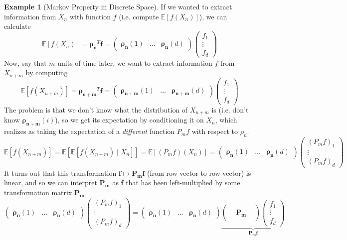 \documentclass{article}
\theoremstyle{definition}
\newtheorem{example}{Example}[section]
\theoremstyle{remark}
\theoremstyle{definition}
\begin{document}
\begin{example}[Markov Property in Discrete Space]
If we wanted to extract information from $X_n$ with function $f$ (i.e. compute $\mathbb{E}[f(X_n)]$), we can calculate 
\[\mathbb{E}[f(X_n)] = \boldsymbol{\rho_n}^T \mathbf{f} =  \begin{pmatrix} \boldsymbol{\rho_n} (1) & \ldots & \boldsymbol{\rho_n} (d) \end{pmatrix} \begin{pmatrix} f_1 \\ \vdots \\ f_d \end{pmatrix}\] 
Now, say that $m$ units of time later, we want to extract information $f$ from $X_{n + m}$ by computing 
\[\mathbb{E}[f(X_{n + m})] = \boldsymbol{\rho_{n + m}}^T \mathbf{f} = \begin{pmatrix} \boldsymbol{\rho_{n+m}} (1) & \ldots &  \boldsymbol{\rho_{n+m}} (d) \end{pmatrix} \begin{pmatrix} f_1 \\ \vdots \\ f_d \end{pmatrix}\]
The problem is that we don't know what the distribution of $X_{n + m}$ is (i.e. don't know $\boldsymbol{\rho_{n + m}} (i)$), so we get its expectation by conditioning it on $X_n$, which realizes as taking the expectation of a \textit{different} function $P_m f$ with respect to $\rho_n$. 
\[\mathbb{E}[f(X_{n + m})] = \mathbb{E}[ \mathbb{E}[ f(X_{n + m}) \mid X_n]] = \mathbb{E}[(P_m f)(X_n)] = \begin{pmatrix} \boldsymbol{\rho_n} (1) & \ldots & \boldsymbol{\rho_n} (d) \end{pmatrix} \begin{pmatrix} (P_m f)_1 \\ \vdots \\(P_m f)_d \end{pmatrix}\]
It turns out that this transformation $\mathbf{f} \mapsto \mathbf{P_m} \mathbf{f}$ (from row vector to row vector) is linear, and so we can interpret $\mathbf{P_m}$ as $\mathbf{f}$ that has been left-multiplied by some transformation matrix $\mathbf{P_m}$. 
\[\begin{pmatrix} \boldsymbol{\rho_n} (1) & \ldots & \boldsymbol{\rho_n} (d) \end{pmatrix} \begin{pmatrix} (P_m f)_1 \\ \vdots \\(P_m f)_d \end{pmatrix} = \begin{pmatrix} \boldsymbol{\rho_n} (1) & \ldots & \boldsymbol{\rho_n} (d) \end{pmatrix} \underbrace{\begin{pmatrix} && \\ & \mathbf{P_m} & \\ && \end{pmatrix} \begin{pmatrix} f_1 \\ \vdots \\ f_d \end{pmatrix}}_{\mathbf{P_m f}}\]

\end{example}
\end{document}
